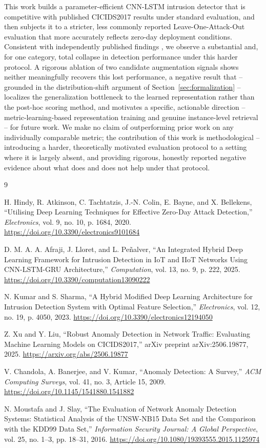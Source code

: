 \documentclass[11pt]{article}
\begin{document}
This work builds a parameter-efficient CNN-LSTM intrusion detector that is competitive with
published CICIDS2017 results under standard evaluation, and then subjects it to a stricter, less
commonly reported Leave-One-Attack-Out evaluation that more accurately reflects zero-day deployment
conditions. Consistent with independently published findings \cite{xu2025}, we observe a substantial
and, for one category, total collapse in detection performance under this harder protocol. A
rigorous ablation of two candidate augmentation signals shows neither meaningfully recovers this
lost performance, a negative result that -- grounded in the distribution-shift argument of
Section~\ref{sec:formalization} -- localizes the generalization bottleneck to the learned
representation rather than the post-hoc scoring method, and motivates a specific, actionable
direction -- metric-learning-based representation training and genuine instance-level retrieval --
for future work. We make no claim of outperforming prior work on any individually comparable metric;
the contribution of this work is methodological -- introducing a harder, theoretically motivated
evaluation protocol to a setting where it is largely absent, and providing rigorous, honestly
reported negative evidence about what does and does not help under that protocol.

\begin{thebibliography}{9}

H. Hindy, R. Atkinson, C. Tachtatzis, J.-N. Colin, E. Bayne, and X. Bellekens,
``Utilising Deep Learning Techniques for Effective Zero-Day Attack Detection,''
\textit{Electronics}, vol. 9, no. 10, p. 1684, 2020.
\url{https://doi.org/10.3390/electronics9101684}

D. M. A. A. Afraji, J. Lloret, and L. Pe\~nalver,
``An Integrated Hybrid Deep Learning Framework for Intrusion Detection in IoT and IIoT Networks Using
CNN-LSTM-GRU Architecture,''
\textit{Computation}, vol. 13, no. 9, p. 222, 2025.
\url{https://doi.org/10.3390/computation13090222}

N. Kumar and S. Sharma,
``A Hybrid Modified Deep Learning Architecture for Intrusion Detection System with Optimal Feature
Selection,''
\textit{Electronics}, vol. 12, no. 19, p. 4050, 2023.
\url{https://doi.org/10.3390/electronics12194050}

Z. Xu and Y. Liu,
``Robust Anomaly Detection in Network Traffic: Evaluating Machine Learning Models on CICIDS2017,''
arXiv preprint arXiv:2506.19877, 2025.
\url{https://arxiv.org/abs/2506.19877}

V. Chandola, A. Banerjee, and V. Kumar,
``Anomaly Detection: A Survey,''
\textit{ACM Computing Surveys}, vol. 41, no. 3, Article 15, 2009.
\url{https://doi.org/10.1145/1541880.1541882}

N. Moustafa and J. Slay,
``The Evaluation of Network Anomaly Detection Systems: Statistical Analysis of the UNSW-NB15 Data
Set and the Comparison with the KDD99 Data Set,''
\textit{Information Security Journal: A Global Perspective}, vol. 25, no. 1--3, pp. 18--31, 2016.
\url{https://doi.org/10.1080/19393555.2015.1125974}

\end{thebibliography}
\end{document}
